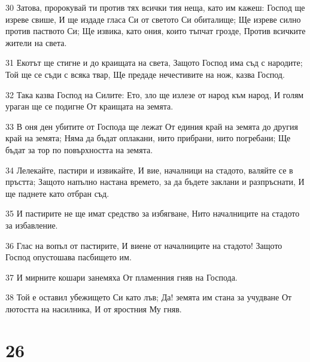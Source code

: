 \par 30 Затова, пророкувай ти против тях всички тия неща, като им кажеш: Господ ще изреве свише, И ще издаде гласа Си от светото Си обиталище; Ще изреве силно против паството Си; Ще извика, като ония, които тъпчат грозде, Против всичките жители на света.
\par 31 Екотът ще стигне и до краищата на света, Защото Господ има съд с народите; Той ще се съди с всяка твар, Ще предаде нечестивите на нож, казва Господ.
\par 32 Така казва Господ на Силите: Ето, зло ще излезе от народ към народ, И голям ураган ще се подигне От краищата на земята.
\par 33 В оня ден убитите от Господа ще лежат От единия край на земята до другия край на земята; Няма да бъдат оплакани, нито прибрани, нито погребани; Ще бъдат за тор по повърхността на земята.
\par 34 Лелекайте, пастири и извикайте, И вие, началници на стадото, валяйте се в пръстта; Защото напълно настана времето, за да бъдете заклани и разпръснати, И ще паднете като отбран съд.
\par 35 И пастирите не ще имат средство за избягване, Нито началниците на стадото за избавление.
\par 36 Глас на вопъл от пастирите, И виене от началниците на стадото! Защото Господ опустошава пасбището им.
\par 37 И мирните кошари занемяха От пламенния гняв на Господа.
\par 38 Той е оставил убежището Си като лъв; Да! земята им стана за учудване От лютостта на насилника, И от яростния Му гняв.

\chapter{26}

